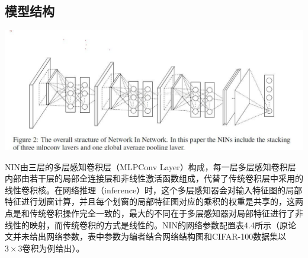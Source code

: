 \documentclass[12pt,a4paper,UTF8,twoside]{book}
\begin{document}
\hypertarget{ux6a21ux578bux7ed3ux6784-3}{%
\subsection{模型结构}\label{ux6a21ux578bux7ed3ux6784-3}}

\begin{center}\includegraphics[width=0.7\linewidth]{img/02-07} \end{center}

\hspace{0pt}NIN由三层的多层感知卷积层（MLPConv Layer）构成，每一层多层感知卷积层内部由若干层的局部全连接层和非线性激活函数组成，代替了传统卷积层中采用的线性卷积核。在网络推理（inference）时，这个多层感知器会对输入特征图的局部特征进行划窗计算，并且每个划窗的局部特征图对应的乘积的权重是共享的，这两点是和传统卷积操作完全一致的，最大的不同在于多层感知器对局部特征进行了非线性的映射，而传统卷积的方式是线性的。NIN的网络参数配置表4.4所示（原论文并未给出网络参数，表中参数为编者结合网络结构图和CIFAR-100数据集以\(3\times3\)卷积为例给出）。
\end{document}
